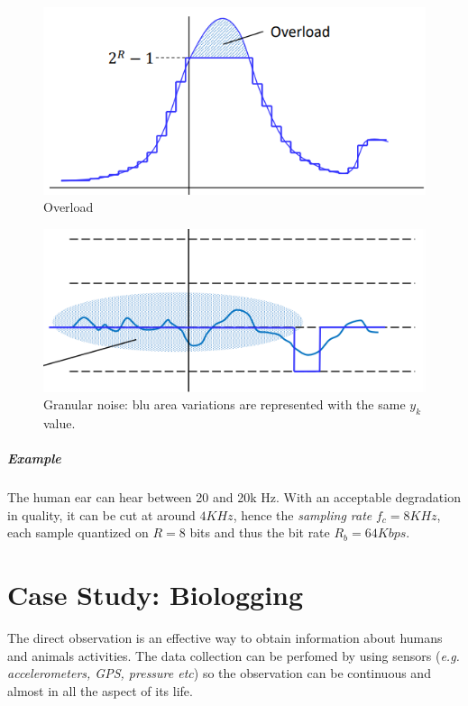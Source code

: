 \documentclass[10pt,a4paper]{report}
\theoremstyle{definition}
\begin{document}
\begin{figure}[h]
	\centering\includegraphics[scale=0.50]{images/Pasted image 20230526142358.png}
	\caption{Overload}
	\label{overload-scenario}
\end{figure}

\begin{figure}[h]
	\centering\includegraphics[scale=0.50]{images/Pasted image 20230526142412.png}
	\caption{Granular noise: blu area variations are represented with the same $y_{k}$ value.}
	\label{granular-noise-scenario}
\end{figure}


\paragraph{Example}\label{sec:example-1}
The human ear can hear between 20 and 20k Hz. With an acceptable degradation in quality, it can be cut at around $4KHz$, hence the \textit{sampling rate} $f_{c} = 8KHz$, each sample quantized on $R=8$ bits and thus the bit rate $R_{b} = 64Kbps$.





\appendix
\iffalse
\chapter{Case Study: Biologging}\label{sec:case-study-biologging}
The direct observation is an effective way to obtain information about humans and animals activities. The data collection can be perfomed by using sensors (\textit{e.g. accelerometers, GPS, pressure etc}) so the observation can be continuous and almost in all the aspect of its life.
\end{document}
